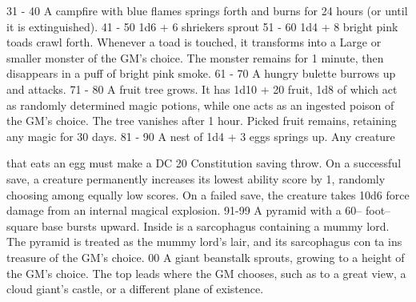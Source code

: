 31 - 40   A campfire with blue flames springs forth and  burns for 24 hours (or until it is extinguished).                                                                                                                                                                                                                                                                               
41 - 50   1d6 + 6 shriekers sprout                                                                                                                                                                                                                                                                                                                                                       
51 - 60   1d4 + 8   bright pink toads crawl forth. Whenever  a toad is touched, it transforms into a Large or  smaller monster of the GM's choice. The  monster remains for 1 minute, then disappears  in a puff of bright pink smoke.                                                                                                                                                   
61 - 70   A hungry bulette burrows up and attacks.                                                                                                                                                                                                                                                                                                                                       
71 - 80   A fruit tree grows. It has 1d10 + 20 fruit, 1d8 of  which act as randomly determined magic  potions, while one acts as an ingested poison of  the GM's choice. The tree vanishes after 1 hour.  Picked fruit remains, retaining any magic for 30  days.                                                                                                                        
81 - 90   A nest of 1d4 + 3 eggs springs up. Any creature                                                                                                                                                                                                                                                                                                                                

       that eats an egg must make a DC 20 Constitution  saving throw. On a successful save, a creature  permanently increases its lowest ability score by  1, randomly choosing among equally low scores.  On a failed save, the creature takes 10d6 force  damage from an internal magical explosion.  
91-99  A pyramid with a 60-- foot-- square base bursts  upward. Inside is a sarcophagus containing a  mummy lord. The pyramid is treated as the  mummy lord's lair, and its sarcophagus con ta ins  treasure of the GM's choice.                                                                        
00     A giant beanstalk sprouts, growing to a height of  the GM's choice. The top leads where the GM  chooses, such as to a great view, a cloud giant's  castle, or a different plane of existence.                                                                                                    


